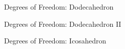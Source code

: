\documentclass{beamer}
\begin{document}
\begin{frame}{Degrees of Freedom: Dodecahedron}
  \centering
{}
\end{frame}
\begin{frame}{Degrees of Freedom: Dodecahedron II}
{}
\end{frame}
\begin{frame}{Degrees of Freedom: Icosahedron}
  \centering
{}
\end{frame}
\end{document}
